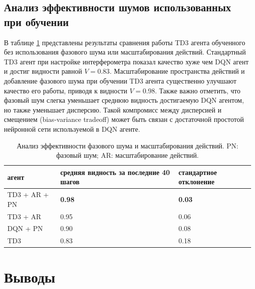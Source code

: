 \subsection{Анализ эффективности шумов использованных при обучении}

В таблице \ref{tab:abl_td3} представлены результаты сравнения работы TD3 агента обученного без использования фазового шума или масштабирования действий. Стандартный TD3 агент при настройке интерферометра показал качество хуже чем DQN агент и достиг видности равной $V = 0.83$. Масштабирование пространства действий и добавление фазового шума при обучении TD3 агента существенно улучшают качество его работы, приводя к видности $V = 0.98$. Также важно отметить, что фазовый шум слегка уменьшает среднюю видность достигаемую DQN агентом, но также уменьшает дисперсию. Такой компромисс между дисперсией и смещением (bias-variance tradeoff) может быть связан с достаточной простотой нейронной сети используемой в DQN агенте. 

\begin{table} [htbp]
    \centering
    \begin{threeparttable}
        \caption{Анализ эффективности фазового шума и масштабирования действий. PN: фазовый шум; AR: масштабирование действий.}\label{tab:abl_td3}
        \begin{tabular}{| p{4cm} || p{6cm} || p{6cm} |}
            \hline
            \hline
            агент & средняя видность за последние 40 шагов & стандартное отклонение \\
            \hline
            TD3 + AR + PN & \textbf{0.98} & \textbf{0.03} \\
            TD3 + AR & 0.95 & 0.06\\
            DQN + PN & 0.90 & 0.08\\
            TD3& 0.83 & 0.18\\
            \hline
            \hline
        \end{tabular}
    \end{threeparttable}
\end{table}

\section{Выводы}

